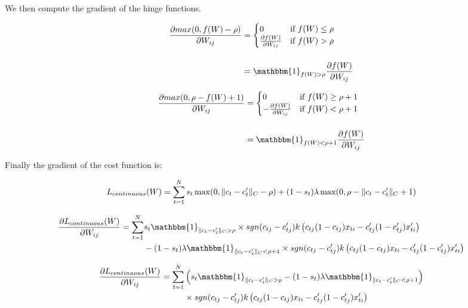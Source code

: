 We then compute the gradient of the hinge functions.

\[
	\begin{split}
		\frac{\partial max(0, f(W) - \rho)}{\partial W_{ij}} & =
		\begin{cases}
		0                                     & \text{if } f(W) \leq \rho \\
		\frac{\partial f(W)}{\partial W_{ij}} & \text{if } f(W) > \rho
		\end{cases} \\[3ex]
		& = \mathbbm{1}_{f(W) > \rho} \frac{\partial f(W)}{\partial W_{ij}}
	\end{split}
\]

\[
	\begin{split}
		\frac{\partial max(0, \rho - f(W) + 1)}{\partial W_{ij}} & =
		\begin{cases}
		0                                      & \text{if } f(W) \geq \rho + 1 \\
		-\frac{\partial f(W)}{\partial W_{ij}} & \text{if } f(W) < \rho + 1
		\end{cases} \\[3ex]
		& = \mathbbm{1}_{f(W) < \rho + 1} \frac{\partial f(W)}{\partial W_{ij}}
	\end{split}
\]

Finally the gradient of the cost function is:

\[
	L_{continuous}(W) = \sum\limits_{t=1}^N s_t\max(0, \lVert c_t - c'_t\rVert_{C} - \rho) + (1-s_t)\lambda\max(0, \rho - \lVert c_t - c'_t\rVert_{C} + 1)
\]

\[
\begin{split}
	\frac{\partial L_{continuous}(W)}{\partial W_{ij}} = \sum\limits_{t=1}^N & s_t \mathbbm{1}_{\norm{c_t - c'_t}_{C} > \rho} \times sgn(c_{tj} - c'_{tj}) k \left(c_{tj} (1 - c_{tj}) x_{ti} - c'_{tj} (1 - c'_{tj}) x'_{ti} \right) \\
& - (1 - s_t) \lambda \mathbbm{1}_{\norm{c_t - c'_t}_{C} < \rho + 1} \times sgn(c_{tj} - c'_{tj}) k \left(c_{tj} (1 - c_{tj}) x_{ti} - c'_{tj} (1 - c'_{tj}) x'_{ti} \right)
\end{split}
\]

\[
\begin{split}
	\frac{\partial L_{continuous}(W)}{\partial W_{ij}} = \sum\limits_{t=1}^N & \left(s_t \mathbbm{1}_{\norm{c_t - c'_t}_{C} > \rho} - (1 - s_t) \lambda \mathbbm{1}_{\norm{c_t - c'_t}_{C} < \rho + 1}\right) \\
& \times sgn(c_{tj} - c'_{tj}) k \left(c_{tj} (1 - c_{tj}) x_{ti} - c'_{tj} (1 - c'_{tj}) x'_{ti} \right)
\end{split}
\]

